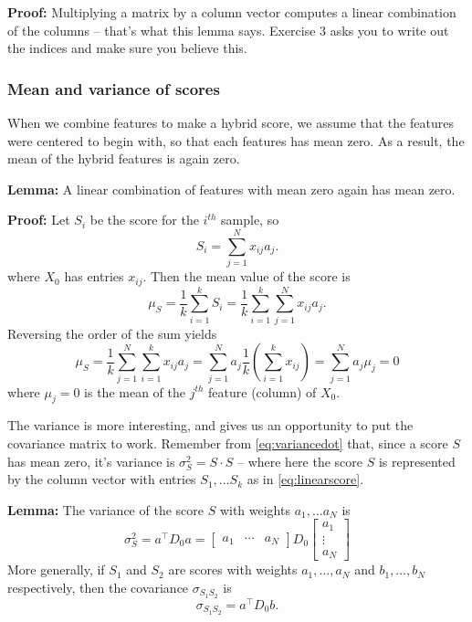 \documentclass[
]{article}
\begin{document}
\textbf{Proof:} Multiplying a matrix by a column vector computes a
linear combination of the columns -- that's what this lemma says.
Exercise 3 asks you to write out the indices and make sure you believe
this.

\hypertarget{mean-and-variance-of-scores}{%
\subsubsection{Mean and variance of
scores}\label{mean-and-variance-of-scores}}

When we combine features to make a hybrid score, we assume that the
features were centered to begin with, so that each features has mean
zero. As a result, the mean of the hybrid features is again zero.

\textbf{Lemma:} A linear combination of features with mean zero again
has mean zero.

\textbf{Proof:} Let \(S_{i}\) be the score for the \(i^{th}\) sample, so
\[
S_{i} = \sum_{j=1}^{N} x_{ij}a_{j}.
\] where \(X_{0}\) has entries \(x_{ij}\). Then the mean value of the
score is \[
\mu_{S} = \frac{1}{k}\sum_{i=1}^{k} S_{i} = \frac{1}{k}\sum_{i=1}^{k}\sum_{j=1}^{N} x_{ij}a_{j}.
\] Reversing the order of the sum yields \[
\mu_{S} = \frac{1}{k}\sum_{j=1}^{N}\sum_{i=1}^{k} x_{ij}a_{j} = \sum_{j=1}^{N} a_{j}\frac{1}{k}(\sum_{i=1}^{k} x_{ij})=
\sum_{j=1}^{N}a_{j}\mu_{j}=0
\] where \(\mu_{j}=0\) is the mean of the \(j^{th}\) feature (column) of
\(X_{0}\).

The variance is more interesting, and gives us an opportunity to put the
covariance matrix to work. Remember from \ref{eq:variancedot} that,
since a score \(S\) has mean zero, it's variance is
\(\sigma_{S}^2=S\cdot S\) -- where here the score \(S\) is represented
by the column vector with entries \(S_{1},\ldots S_{k}\) as in
\cref{eq:linearscore}.

\textbf{Lemma:} The variance of the score \(S\) with weights
\(a_1,\ldots a_N\) is \begin{equation}
\sigma_{S}^2 = a^{\intercal}D_{0}a = \left[\begin{matrix}a_{1} & \cdots & a_{N}\end{matrix}\right]D_{0}
\left[\begin{matrix} a_{1} \\ \vdots \\ a_{N}\end{matrix}\right]
\label{eq:ada}\end{equation} More generally, if \(S_{1}\) and \(S_{2}\)
are scores with weights \(a_1,\ldots, a_N\) and \(b_1,\ldots, b_N\)
respectively, then the covariance \(\sigma_{S_{1}S_{2}}\) is \[
\sigma_{S_{1}S_{2}} = a^{\intercal}D_{0}b.
\]
\end{document}
